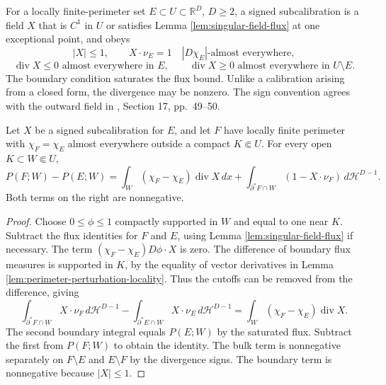 \begin{definition}\label{def:signed-subcalibration}
For a locally finite-perimeter set $E\subset U\subset\mathbb R^D$, $D\geq2$, a signed subcalibration is a field $X$ that is $C^1$ in $U$ or satisfies Lemma \ref{lem:singular-field-flux} at one exceptional point, and obeys
\[
 |X|\leq1,\qquad X\cdot\nu_E=1\quad |D\chi_E|\text{-almost everywhere},
\]
\[
 \operatorname{div}X\leq0\text{ almost everywhere in }E,
 \qquad \operatorname{div}X\geq0\text{ almost everywhere in }U\setminus E.
\]
The boundary condition saturates the flux bound. Unlike a calibration arising from a closed form, the divergence may be nonzero. The sign convention agrees with the outward field in \cite{ChMin}, Section 17, pp.~49--50.
\end{definition}

\begin{proposition}\label{prop:subcalibration-gap}
Let $X$ be a signed subcalibration for $E$, and let $F$ have locally finite perimeter with $\chi_F=\chi_E$ almost everywhere outside a compact $K\Subset U$. For every open $K\subset W\Subset U$,
\[
 P(F;W)-P(E;W)
 =\int_W(\chi_F-\chi_E)\operatorname{div}X\,dx
 +\int_{\partial^*F\cap W}(1-X\cdot\nu_F)\,d\mathcal H^{D-1}.
\]
Both terms on the right are nonnegative.
\end{proposition}
\begin{proof}
Choose $0\leq\phi\leq1$ compactly supported in $W$ and equal to one near $K$. Subtract the flux identities for $F$ and $E$, using Lemma \ref{lem:singular-field-flux} if necessary. The term $(\chi_F-\chi_E)D\phi\cdot X$ is zero. The difference of boundary flux measures is supported in $K$, by the equality of vector derivatives in Lemma \ref{lem:perimeter-perturbation-locality}. Thus the cutoffs can be removed from the difference, giving
\[
 \int_{\partial^*F\cap W}X\cdot\nu_F\,d\mathcal H^{D-1}
 -\int_{\partial^*E\cap W}X\cdot\nu_E\,d\mathcal H^{D-1}
 =\int_W(\chi_F-\chi_E)\operatorname{div}X.
\]
The second boundary integral equals $P(E;W)$ by the saturated flux. Subtract the first from $P(F;W)$ to obtain the identity. The bulk term is nonnegative separately on $F\setminus E$ and $E\setminus F$ by the divergence signs. The boundary term is nonnegative because $|X|\leq1$.
\end{proof}

